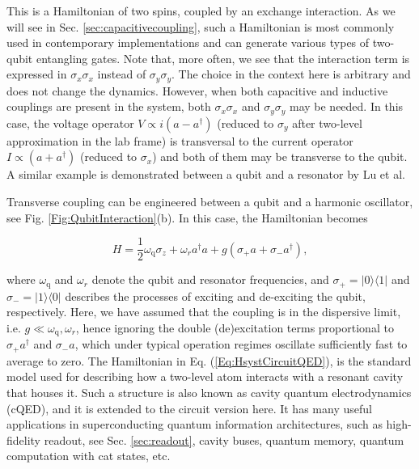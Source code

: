 \documentclass[aip,apr,twocolumn,showpacs,superscriptaddress,groupedaddress,nofootinbib,reprint]{revtex4-1}  %
\newcommand{\freq}{\omega_\text{q}}
\begin{document}
This is a Hamiltonian of two spins, coupled by an exchange interaction. As we will see in Sec. \ref{sec:capacitivecoupling}, such a Hamiltonian is most commonly used in contemporary implementations and can generate various types of two-qubit entangling gates. Note that, more often, we see that the interaction term is expressed in $\sigma_{x}\sigma_{x}$ instead of $\sigma_{y}\sigma_{y}$. The choice in the context here is arbitrary and does not change the dynamics. However, when both capacitive and inductive couplings are present in the system, both $\sigma_{x}\sigma_{x}$ and $\sigma_{y}\sigma_{y}$ may be needed. In this case, the voltage operator $V \propto i(a - a^{\dagger})$ (reduced to $\sigma_{y}$ after two-level approximation in the lab frame) is transversal to the current operator $I \propto (a + a^{\dagger})$ (reduced to $\sigma_{x}$) and both of them may be transverse to the qubit. A similar example is demonstrated between a qubit and a resonator by Lu et al.\cite{Lu2017}

Transverse coupling can be engineered between a qubit and a harmonic oscillator, see Fig. \ref{Fig:QubitInteraction}(b). In this case, the Hamiltonian becomes

\begin{equation}
H = \frac{1}{2}\freq \sigma_{z} + \omega_{r}a^{\dagger}a + g (\sigma_{+}a + \sigma_{-}a^{\dagger}),
\label{Eq:HsystCircuitQED}
\end{equation}

\noindent where $\freq$ and $\omega_r$ denote the qubit and resonator frequencies, and $\sigma_+ = |0\rangle \langle1|$ and $\sigma_- = |1\rangle\langle 0|$ describes the processes of exciting and de-exciting the qubit, respectively. Here, we have assumed that the coupling is in the dispersive limit, i.e. $g \ll \freq, \omega_r$, hence ignoring the double (de)excitation terms proportional to $\sigma_{+}a^{\dagger}$ and $\sigma_{-}a$, which under typical operation regimes oscillate sufficiently fast to average to zero. The Hamiltonian in Eq. (\ref{Eq:HsystCircuitQED}), is the standard model used for describing how a two-level atom interacts with a resonant cavity that houses it. Such a structure is also known as cavity quantum electrodynamics (cQED), and it is extended to the circuit version here. It has many useful applications in superconducting quantum information architectures, such as high-fidelity readout\cite{Wallraff2004}, see Sec. \ref{sec:readout}, cavity buses\cite{Sandberg2008}, quantum memory\cite{Pierre2014,Yin2013}, quantum computation with cat states\cite{Ofek2016,Wang2016,Axline2016}, etc.
\end{document}

